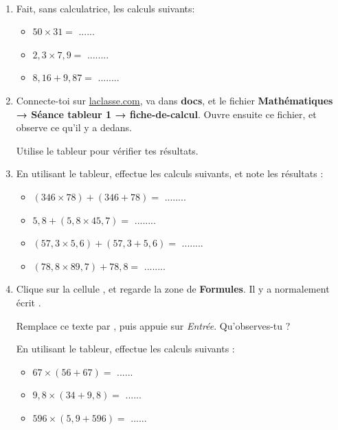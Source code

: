 \documentclass[a4paper,11pt]{article}
\begin{document}
\begin{exercice}\
	\begin{enumerate}
		\item Fait, sans calculatrice, les calculs suivants:
		      \begin{itemize}
			      \item $50 × 31 = $ ...... %
			      \item $2,3 × 7,9 = $ ........ %
			      \item $8,16 + 9,87 = $ ........ %
		      \end{itemize}
		\item Connecte-toi sur \url{laclasse.com}, va dans  \textbf{docs}, et  le fichier \textbf{Mathématiques → Séance tableur 1 → fiche-de-calcul}. Ouvre ensuite ce fichier, et observe ce qu'il y a dedans. \vspace{1em}

		      Utilise le tableur pour vérifier tes résultats.
		\item En utilisant le tableur, effectue les calculs suivants, et note les résultats :
		      \begin{itemize}
			      \item $(346 × 78) + (346 + 78) = $ ........
			      \item $5,8 + (5,8 × 45,7) = $ ........
			      \item $(57,3 × 5,6) + (57,3 + 5,6) = $ ........
			      \item $(78,8 × 89,7) + 78,8 = $ ........
		      \end{itemize}
		\item Clique sur la cellule , et regarde la zone de \textbf{Formules}. Il y a normalement écrit .

		      Remplace ce texte par , puis appuie sur \textit{Entrée}. Qu'observes-tu ?

		      En utilisant le tableur, effectue les calculs suivants :
		      \begin{itemize}
			      \item $67 × (56 + 67) = $ ......

			      \item $9,8 × (34 + 9,8) = $ ......

			      \item $596 × (5,9 + 596) = $ ......
		      \end{itemize}
	\end{enumerate}
\end{exercice}
\end{document}
